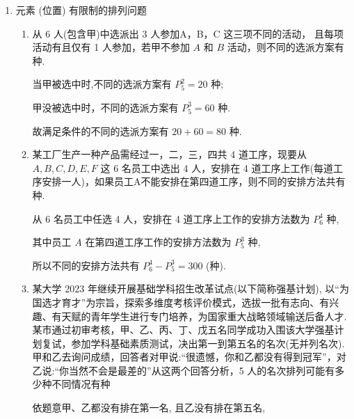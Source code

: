 \begin{enumerate}
\begin{enumerate}
\begin{jieda}
\begin{enumerate}
                第一类,若两人来自(1)班和(48)班，有 $7 \times  5 = {35}$ 种选法，
                
                第二列，若两人来自(1)班和(62)班，有 $7 \times  9 = {63}$ 种选法，
                
                第三类，若两人来(48)班和(62)班，有 $5 \times  9 = {45}$ 种选法，
                
                综上可知,这两人来自不同的班级的不同的选法有 ${35} + {63} + {45} = {143}$ 种.
            \end{enumerate}
        \end{jieda}
    \end{enumerate}
    \item 元素 (位置) 有限制的排列问题
    \begin{enumerate}
        \item 从 6 人(包含甲)中选派出 3 人参加A，B，C 这三项不同的活动， 且每项活动有且仅有 1 人参加，若甲不参加 $A$ 和 $B$ 活动，则不同的选派方案有种.
        \begin{jieda}
            当甲被选中时,不同的选派方案有 $P_{5}^{2} = {20}$ 种;
            
            甲没被选中时，不同的选派方案有 $P_{5}^{3} = {60}$ 种.
            
            故满足条件的不同的选派方案有 ${20} + {60} = {80}$ 种.
        \end{jieda}
        \item 某工厂生产一种产品需经过一，二，三，四共 4 道工序，现要从 $A,B,C,D,E,F$ 这 6 名员工中选出 4 人，安排在 4 道工序上工作(每道工序安排一人)，如果员工A不能安排在第四道工序，则不同的安排方法共有种.
        \begin{jieda}
            从 6 名员工中任选 4 人，安排在 4 道工序上工作的安排方法数为 $P_{6}^{4}$ 种,
            
            其中员工 ${A}$ 在第四道工序工作的安排方法数为 $P_{5}^{3}$ 种,
            
            所以不同的安排方法共有 $P_{6}^{4} - P_{5}^{3} = {300}$ (种).
        \end{jieda}
        
        \item 某大学 2023 年继续开展基础学科招生改革试点(以下简称强基计划), 以“为国选才育才”为宗旨，探索多维度考核评价模式，选拔一批有志向、有兴趣、有天赋的青年学生进行专门培养，为国家重大战略领域输送后备人才. 某市通过初审考核，甲、乙、丙、丁、戊五名同学成功入围该大学强基计划复试，参加学科基础素质测试，决出第一到第五名的名次(无并列名次). 甲和乙去询问成绩，回答者对甲说:“很遗憾，你和乙都没有得到冠军”，对乙说:“你当然不会是最差的”从这两个回答分析，5 人的名次排列可能有多少种不同情况有种
        \begin{jieda}
            依题意甲、乙都没有排在第一名, 且乙没有排在第五名,
            

\end{jieda}
\end{enumerate}
\end{enumerate}
